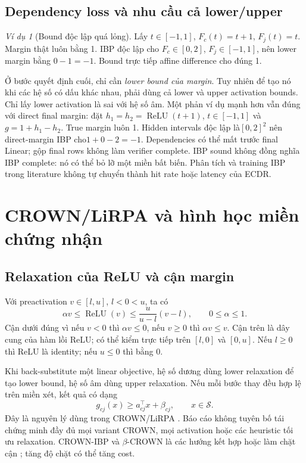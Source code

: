 \documentclass[11pt,a4paper]{article}
\newcommand{\relu}{\operatorname{ReLU}}
\newcommand{\Sset}{\mathcal S}
\theoremstyle{remark}
\newtheorem{example}[definition]{Ví dụ}
\begin{document}
\subsection{Dependency loss và nhu cầu cả lower/upper}
\begin{example}[Bound độc lập quá lỏng]
Lấy $t\in[-1,1]$, $F_c(t)=t+1$, $F_j(t)=t$. Margin thật luôn bằng 1.
IBP độc lập cho $F_c\in[0,2]$, $F_j\in[-1,1]$, nên lower margin bằng
$0-1=-1$. Bound trực tiếp affine difference cho đúng 1.
\end{example}
Ở bước quyết định cuối, chỉ cần \emph{lower bound của margin}. Tuy nhiên
để tạo nó khi các hệ số có dấu khác nhau, phải dùng cả lower và upper
activation bounds. Chỉ lấy lower activation là sai với hệ số âm.
Một phản ví dụ mạnh hơn vẫn đúng với direct final margin: đặt
$h_1=h_2=\relu(t+1)$, $t\in[-1,1]$ và $g=1+h_1-h_2$.
True margin luôn 1. Hidden intervals độc lập là$[0,2]^2$ nên direct-margin
IBP cho$1+0-2=-1$. Dependencies có thể mất trước final Linear;
gộp final rows không làm verifier complete.
IBP sound không đồng nghĩa IBP complete: nó có thể bỏ lỡ một miền bất biến.
Phân tích và training IBP trong literature \cite{ibp} không tự chuyển thành
hit rate hoặc latency của ECDR.

\section{CROWN/LiRPA và hình học miền chứng nhận}
\subsection{Relaxation của ReLU và cận margin}
Với preactivation $v\in[l,u]$, $l<0<u$, ta có
\begin{equation}
 \alpha v\le\relu(v)\le\frac{u}{u-l}(v-l),\qquad0\le\alpha\le1.
 \label{eq:relu-relax}
\end{equation}
Cận dưới đúng vì nếu $v<0$ thì $\alpha v\le0$, nếu $v\ge0$ thì
$\alpha v\le v$. Cận trên là dây cung của hàm lồi ReLU; có thể kiểm trực
tiếp trên $[l,0]$ và $[0,u]$. Nếu $l\ge0$ thì ReLU là identity; nếu
$u\le0$ thì bằng 0.

Khi back-substitute một linear objective, hệ số dương dùng lower
relaxation để tạo lower bound, hệ số âm dùng upper relaxation. Nếu mỗi
bước thay đều hợp lệ trên miền xét, kết quả có dạng
\begin{equation}
 g_{cj}(x)\ge a_{cj}^\top x+\beta_{cj},\qquad x\in\Sset.
 \label{eq:affine-lower}
\end{equation}
Đây là nguyên lý dùng trong CROWN/LiRPA \cite{crown,lirpa}. Báo cáo không
tuyên bố tái chứng minh đầy đủ mọi variant CROWN, mọi activation hoặc các
heuristic tối ưu relaxation. CROWN-IBP và $\beta$-CROWN là các hướng kết hợp
hoặc làm chặt cận \cite{crownibp,betacrown}; tăng độ chặt có thể tăng cost.
\end{document}
